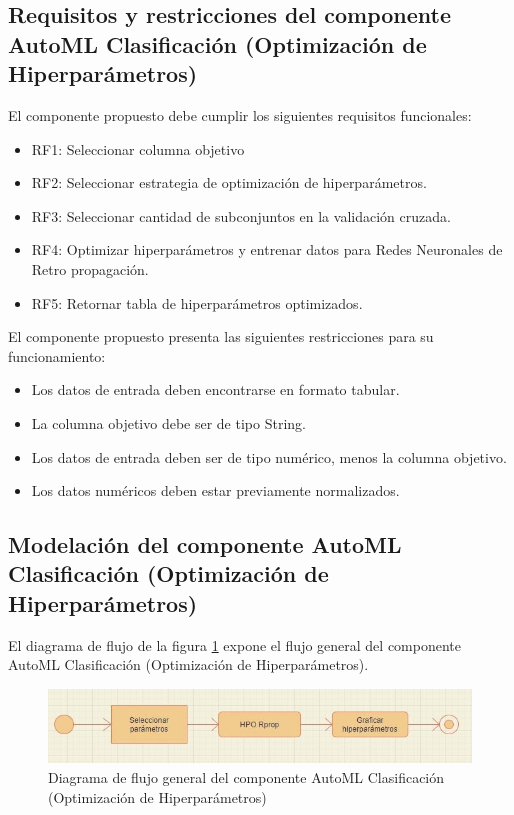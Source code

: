 \subsection{Requisitos y restricciones del componente AutoML Clasificación (Optimización de Hiperparámetros)}
El componente propuesto debe cumplir los siguientes requisitos funcionales:

\begin{itemize}
	\item RF1: Seleccionar columna objetivo
	\item RF2: Seleccionar estrategia de optimización de hiperparámetros.
	\item RF3: Seleccionar cantidad de subconjuntos en la validación cruzada.
	\item RF4: Optimizar hiperparámetros y entrenar datos para Redes Neuronales de Retro propagación.
	\item RF5: Retornar tabla de hiperparámetros optimizados.
\end{itemize}

El componente propuesto presenta las siguientes restricciones para su funcionamiento:

\begin{itemize}
	\item Los datos de entrada deben encontrarse en formato tabular.
	\item La columna objetivo debe ser de tipo String.
	\item Los datos de entrada deben ser de tipo numérico, menos la columna objetivo.
	\item Los datos numéricos deben estar previamente normalizados.
\end{itemize}

\subsection{Modelación del componente AutoML Clasificación (Optimización de Hiperparámetros)}
El diagrama de flujo de la figura \ref{fig:diagrama-flujo-gral-comp-hpo} expone el flujo general del componente AutoML Clasificación (Optimización de Hiperparámetros).

\begin{figure}[H]
	\centering
	\includegraphics[width=0.7\linewidth]{"figuras/capi 2/diagrama-flujo-gral-comp-hpo"}
	\caption[Diagrama de flujo general del componente AutoML Clasificación (Optimización de Hiperparámetros)]{Diagrama de flujo general del componente AutoML Clasificación (Optimización de Hiperparámetros)}
	\label{fig:diagrama-flujo-gral-comp-hpo}
\end{figure}

